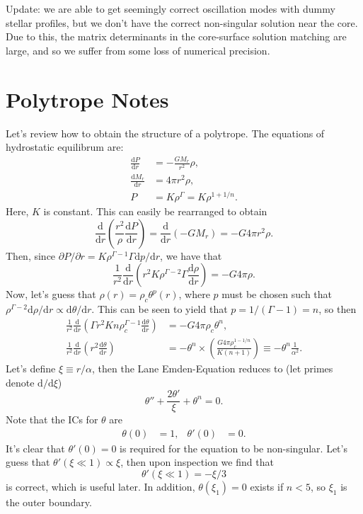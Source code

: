 \documentclass[11pt,
        usenames, %
        twocolumn,
        landscape,
        dvipsnames %
    ]{article}
\newcommand*{\rd}[2]{\frac{\mathrm{d}#1}{\mathrm{d}#2}}
\newcommand*{\rdil}[2]{\mathrm{d}#1 / \mathrm{d}#2}
\newcommand*{\pdil}[2]{\partial#1 / \partial#2}
\newcommand*{\p}[1]{\left(#1\right)}
\begin{document}
Update: we are able to get seemingly correct oscillation modes with dummy
stellar profiles, but we don't have the correct non-singular solution near the
core. Due to this, the matrix determinants in the core-surface solution matching
are large, and so we suffer from some loss of numerical precision.

\section{Polytrope Notes}

Let's review how to obtain the structure of a polytrope. The equations of
hydrostatic equilibrum are:
\begin{align}
    \rd{P}{r} &= -\frac{GM_r}{r^2}\rho,\\
    \rd{M_r}{r} &= 4\pi r^2\rho,\\
    P &= K\rho^\Gamma = K\rho^{1 + 1/n}.
\end{align}
Here, $K$ is constant. This can easily be rearranged to obtain
\begin{equation}
    \rd{}{r}\p{\frac{r^2}{\rho}\rd{P}{r}} = \rd{}{r}\p{-GM_r} = -G4\pi r^2\rho.
\end{equation}
Then, since $\pdil{P}{r} = K\rho^{\Gamma - 1}\Gamma \rdil{p}{r}$, we have that
\begin{equation}
    \frac{1}{r^2}\rd{}{r}\p{r^2 K\rho^{\Gamma - 2}\Gamma \rd{\rho}{r}}
        = -G 4\pi \rho.
\end{equation}
Now, let's guess that $\rho(r) = \rho_c \theta^p(r)$, where $p$ must be
chosen such that $\rho^{\Gamma - 2}\rdil{\rho}{r} \propto \rdil{\theta}{r}$.
This can be seen to yield that $p = 1 / (\Gamma - 1) = n$, so then
\begin{align}
    \frac{1}{r^2}\rd{}{r}\p{\Gamma r^2Kn\rho_c^{\Gamma - 1}\rd{\theta}{r}}
        &= -G 4\pi \rho_c \theta^n,\\
    \frac{1}{r^2}\rd{}{r}\p{r^2\rd{\theta}{r}}
        &= -\theta^n \times \p{\frac{G4\pi \rho_c^{1 - 1/n}}{K\p{n + 1}}}
        \equiv -\theta^n \frac{1}{\alpha^2}.
\end{align}
Let's define $\xi \equiv r/\alpha$, then the Lane Emden-Equation reduces to (let
primes denote $\rdil{}{\xi}$)
\begin{equation}
    \theta'' + \frac{2\theta'}{\xi} +\theta^n = 0.
\end{equation}
Note that the ICs for $\theta$ are
\begin{align}
    \theta(0) &= 1, & \theta'(0) &= 0.
\end{align}
It's clear that $\theta'(0) = 0$ is required for the equation to be non-singular.
Let's guess that $\theta'(\xi \ll 1) \propto \xi$, then upon inspection we find
that
\begin{equation}
    \theta'(\xi \ll 1) = -\xi / 3
\end{equation}
is correct, which is useful later. In addition, $\theta(\xi_1) = 0$ exists if $n
< 5$, so $\xi_1$ is the outer boundary.
\end{document}
